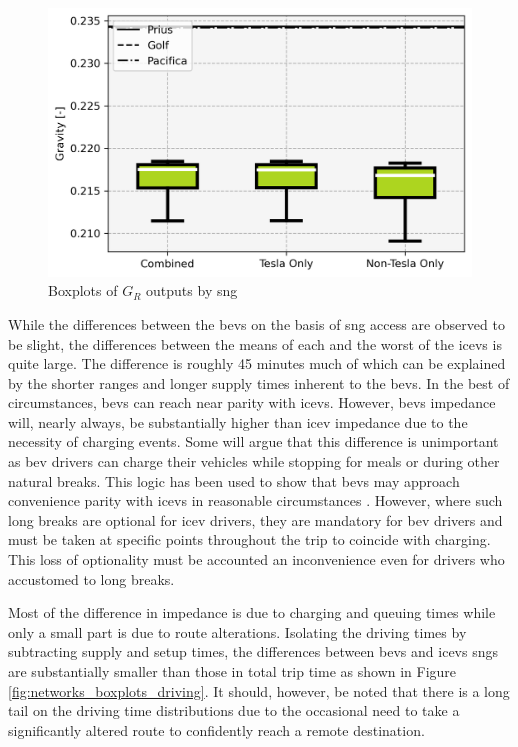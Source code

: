 \begin{multicols}{2}
\begin{figure}[H]
	\centering
	\includegraphics[width = \linewidth]{figs/Networks_Boxplots_Gravity.png}
	\caption{Boxplots of $G_R$ outputs by \gls{sng}}
	\label{fig:networks_boxplots_gravity}
\end{figure}

While the differences between the \glspl{bev} on the basis of \gls{sng} access are observed to be slight, the differences between the means of each and the worst of the \glspl{icev} is quite large. The difference is roughly 45 minutes much of which can be explained by the shorter ranges and longer supply times inherent to the \glspl{bev}. In the best of circumstances, \glspl{bev} can reach near parity with \glspl{icev}. However, \glspl{bev} impedance will, nearly always, be substantially higher than \gls{icev} impedance due to the necessity of charging events. Some will argue that this difference is unimportant as \gls{bev} drivers can charge their vehicles while stopping for meals or during other natural breaks. This logic has been used to show that \glspl{bev} may approach convenience parity with \glspl{icev} in reasonable circumstances \cite{Dixon_2020}. However, where such long breaks are optional for \gls{icev} drivers, they are mandatory for \gls{bev} drivers and must be taken at specific points throughout the trip to coincide with charging. This loss of optionality must be accounted an inconvenience even for drivers who accustomed to long breaks.

Most of the difference in impedance is due to charging and queuing times while only a small part is due to route alterations. Isolating the driving times by subtracting supply and setup times, the differences between \glspl{bev} and \glspl{icev} \glspl{sng} are substantially smaller than those in total trip time as shown in Figure \ref{fig:networks_boxplots_driving}. It should, however, be noted that there is a long tail on the driving time distributions due to the occasional need to take a significantly altered route to confidently reach a remote destination.


\end{multicols}
